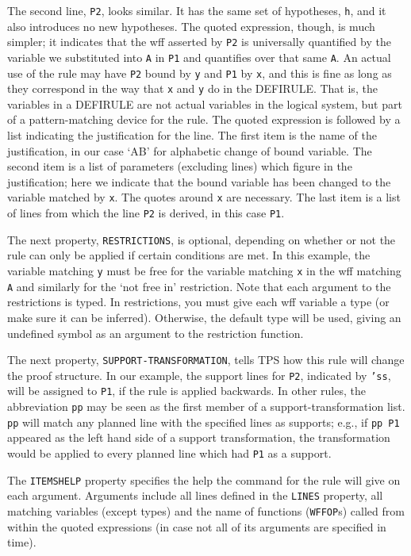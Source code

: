 The second line, {\tt P2}, looks similar. It has the same set of hypotheses,
{\tt h}, and it also introduces no new hypotheses. The quoted expression,
though, is much simpler; it indicates that the wff asserted by {\tt P2}
is universally quantified by the variable we substituted into {\tt A}
in {\tt P1} and quantifies over that same {\tt A}. An actual use of the rule
may have {\tt P2} bound by {\tt y} and {\tt P1} by {\tt x}, and this is fine as
long as they correspond in the way that {\tt x} and {\tt y} do in the DEFIRULE.
That is, the variables in a DEFIRULE are not actual variables in the logical
system, but part of a pattern-matching device for the rule. The quoted
expression is followed by a list indicating the justification for the line.
The first item is the name of the justification, in our case `AB' for
alphabetic change of bound variable. The second item is a list of parameters
(excluding lines) which figure in the justification; here we indicate
that the bound variable has been changed to the variable matched by {\tt x}.
The quotes around {\tt x} are necessary.
The last item is a list of lines from which the line {\tt P2} is derived,
in this case {\tt P1}.

The next property, {\tt RESTRICTIONS}, is optional, depending on whether
or not the rule can only be applied if certain conditions are met.
In this example, the variable matching {\tt y} must be free for the variable
matching {\tt x} in the wff matching {\tt A} and similarly for the `not free in'
restriction. Note that each argument to the restrictions is typed.
In restrictions, you must give each wff variable a type (or make sure it can be
inferred). Otherwise, the default type will be used, giving an undefined
symbol as an argument to the restriction function.

The next property, {\tt SUPPORT-TRANSFORMATION}, tells TPS how this rule
will change the proof structure. In our example, the support lines for
{\tt P2}, indicated by {\tt 'ss}, will be assigned to {\tt P1}, if the rule
is applied backwards.  In other rules, the abbreviation {\tt pp} may be
seen as the first member of a support-transformation list.  {\tt pp} will
match any planned line with the specified lines as supports; e.g., if
{\tt pp P1} appeared as the left hand side of a support transformation,
the transformation would be applied to every planned line which had
{\tt P1} as a support.

The {\tt ITEMSHELP} property specifies the help the command for the rule
will give on each argument. Arguments include all lines defined in the
{\tt LINES} property, all matching variables (except types) and the
name of functions ({\tt WFFOP}s) called from within the quoted expressions
(in case not all of its arguments are specified in time).

